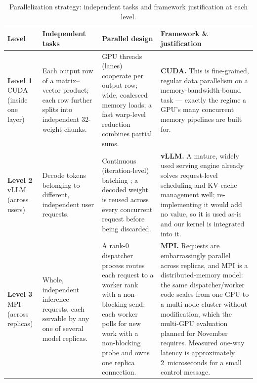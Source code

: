 \documentclass[11pt,a4paper]{article}
\begin{document}
\begin{table}[!htb]
\caption{Parallelization strategy: independent tasks and framework justification at each level.}
\label{tab:parallel}
\centering
\small
\renewcommand{\arraystretch}{1.25}
\begin{tabular}{@{}>{\raggedright\arraybackslash}p{2.0cm}>{\raggedright\arraybackslash}p{4.0cm}>{\raggedright\arraybackslash}p{4.9cm}>{\raggedright\arraybackslash}p{4.9cm}@{}}
\toprule
\textbf{Level} & \textbf{Independent tasks} & \textbf{Parallel design} & \textbf{Framework \& justification} \\
\midrule
\textbf{Level 1} \newline CUDA \newline (inside one layer) &
Each output row of a matrix--vector product; each row further splits into independent 32-weight chunks. &
16 GPU threads (lanes) cooperate per output row; wide, coalesced memory loads; a fast warp-level reduction combines
partial sums. &
\textbf{CUDA.} This is fine-grained, regular data parallelism on a memory-bandwidth-bound task --- exactly the
regime a GPU's many concurrent memory pipelines are built for. \\
\addlinespace
\textbf{Level 2} \newline vLLM \newline (across users) &
Decode tokens belonging to different, independent user requests. &
Continuous (iteration-level) batching \cite{orca}; a decoded weight is reused across every concurrent request
before being discarded. &
\textbf{vLLM.} A mature, widely used serving engine already solves request-level scheduling and KV-cache management
well; re-implementing it would add no value, so it is used as-is and our kernel is integrated into it. \\
\addlinespace
\textbf{Level 3} \newline MPI \newline (across replicas) &
Whole, independent inference requests, each servable by any one of several model replicas. &
A rank-0 dispatcher process routes each request to a worker rank with a non-blocking send; each worker polls for new
work with a non-blocking probe and owns one replica connection. &
\textbf{MPI.} Requests are embarrassingly parallel across replicas, and MPI is a distributed-memory model: the same
dispatcher/worker code scales from one GPU to a multi-node cluster without modification, which the multi-GPU
evaluation planned for November requires. Measured one-way latency is approximately 2~microseconds for a small
control message. \\
\bottomrule
\end{tabular}
\end{table}
\end{document}
